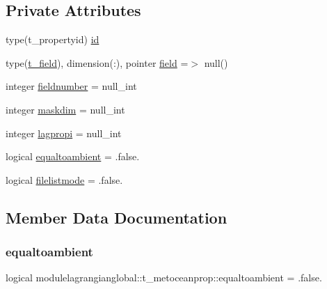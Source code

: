 \subsection*{Private Attributes}
\begin{DoxyCompactItemize}
\item 
type(t\+\_\+propertyid) \mbox{\hyperlink{structmodulelagrangianglobal_1_1t__metoceanprop_a8954cc69f7b5238ef242e015afdc50b7}{id}}
\item 
type(\mbox{\hyperlink{structmodulelagrangianglobal_1_1t__field}{t\+\_\+field}}), dimension(\+:), pointer \mbox{\hyperlink{structmodulelagrangianglobal_1_1t__metoceanprop_ab00e52a4766bdbad887e0a0ec3392912}{field}} =$>$ null()
\item 
integer \mbox{\hyperlink{structmodulelagrangianglobal_1_1t__metoceanprop_aa357860ca4b517f3e60cf21ebeb83049}{fieldnumber}} = null\+\_\+int
\item 
integer \mbox{\hyperlink{structmodulelagrangianglobal_1_1t__metoceanprop_a66c25ad9da2c15b40c78e5e20455c47f}{maskdim}} = null\+\_\+int
\item 
integer \mbox{\hyperlink{structmodulelagrangianglobal_1_1t__metoceanprop_acdd846fdf187041b95bb449706dbbe3b}{lagpropi}} = null\+\_\+int
\item 
logical \mbox{\hyperlink{structmodulelagrangianglobal_1_1t__metoceanprop_a8624510448a3466ecbc3d3eade07352d}{equaltoambient}} = .false.
\item 
logical \mbox{\hyperlink{structmodulelagrangianglobal_1_1t__metoceanprop_ab09a82dd9489d6d64f3c86927b42be74}{filelistmode}} = .false.
\end{DoxyCompactItemize}


\subsection{Member Data Documentation}
\mbox{\label{structmodulelagrangianglobal_1_1t__metoceanprop_a8624510448a3466ecbc3d3eade07352d}} 
\subsubsection{\texorpdfstring{equaltoambient}{equaltoambient}}
{\footnotesize\ttfamily logical modulelagrangianglobal\+::t\+\_\+metoceanprop\+::equaltoambient = .false.\hspace{0.3cm}{\ttfamily [private]}}

